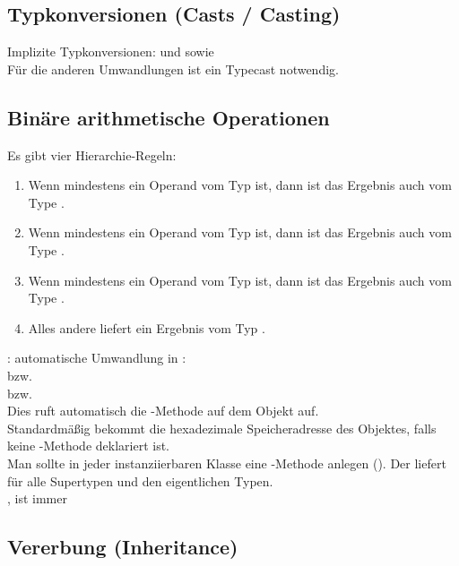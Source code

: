 \subsection{Typkonversionen (Casts / Casting)}
Implizite Typkonversionen:
 und 
sowie \\
Für die anderen Umwandlungen ist ein  Typecast notwendig.

\subsection{Binäre arithmetische Operationen}
Es gibt vier Hierarchie-Regeln:
\begin{enumerate}[label=(\arabic*)]
	\item Wenn mindestens ein Operand vom Typ  ist, dann ist das Ergebnis auch vom Type .
	\item Wenn mindestens ein Operand vom Typ  ist, dann ist das Ergebnis auch vom Type .
	\item Wenn mindestens ein Operand vom Typ  ist, dann ist das Ergebnis auch vom Type .
	\item Alles andere liefert ein Ergebnis vom Typ .
\end{enumerate}

: automatische Umwandlung in :\\
 bzw.   \\
 bzw. \\
Dies ruft automatisch die -Methode auf dem Objekt auf.\\
Standardmäßig bekommt die hexadezimale Speicheradresse des Objektes, falls keine -Methode deklariert ist.\\
Man sollte in jeder instanziierbaren Klasse eine -Methode anlegen ().\nl
Der  liefert  für alle Supertypen und den eigentlichen Typen.\\
, 
 ist immer 

\subsection{Vererbung (Inheritance)}

